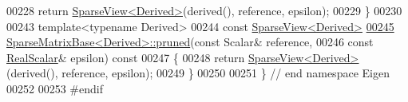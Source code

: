 \begin{DoxyCode}
00228   \textcolor{keywordflow}{return} \hyperlink{group___sparse_core___module_class_eigen_1_1_sparse_view}{SparseView<Derived>}(derived(), reference, epsilon);
00229 \}
00230 
00243 \textcolor{keyword}{template}<\textcolor{keyword}{typename} Derived>
00244 \textcolor{keyword}{const} \hyperlink{group___sparse_core___module_class_eigen_1_1_sparse_view}{SparseView<Derived>}
\hyperlink{group___sparse_core___module_ac8d0414b56d9d620ce9a698c1b281e5d}{00245} \hyperlink{group___sparse_core___module_ac8d0414b56d9d620ce9a698c1b281e5d}{SparseMatrixBase<Derived>::pruned}(\textcolor{keyword}{const} Scalar& reference,
00246                                   \textcolor{keyword}{const} \hyperlink{group___sparse_core___module_aaec8ace6efb785c81d442931c3248d88}{RealScalar}& epsilon)\textcolor{keyword}{ const}
00247 \textcolor{keyword}{}\{
00248   \textcolor{keywordflow}{return} \hyperlink{group___sparse_core___module_class_eigen_1_1_sparse_view}{SparseView<Derived>}(derived(), reference, epsilon);
00249 \}
00250 
00251 \} \textcolor{comment}{// end namespace Eigen}
00252 
00253 \textcolor{preprocessor}{#endif}
\end{DoxyCode}
